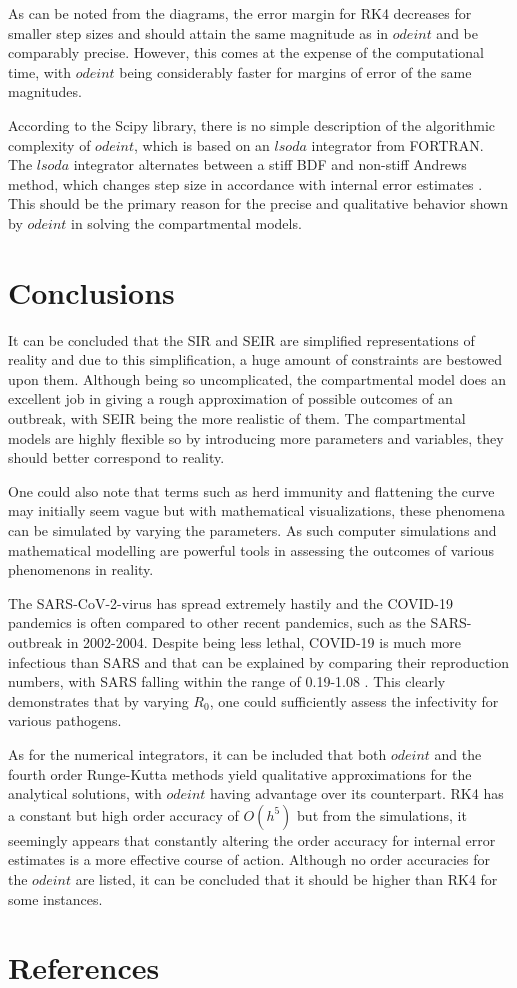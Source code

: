 \documentclass[12pt]{article}
\begin{document}
\noindent As can be noted from the diagrams, the error margin for RK4 decreases for smaller step sizes and should attain the same magnitude as in $odeint$ and be comparably precise. However, this comes at the expense of the computational time, with $odeint$ being considerably faster for margins of error of the same magnitudes. 

According to the Scipy library, there is no simple description of the algorithmic complexity of $odeint$, which is based on an $lsoda$ integrator from FORTRAN. The $lsoda$ integrator alternates between a stiff BDF and non-stiff Andrews method, which changes step size in accordance with internal error estimates \cite{scipy}.  This should be the primary reason for the precise and qualitative behavior shown by $odeint$ in solving the compartmental models. 


\newpage 
\section{Conclusions}
It can be concluded that the SIR and SEIR are simplified representations of reality and due to this simplification, a huge amount of constraints are bestowed upon them. Although being so uncomplicated, the compartmental model does an excellent job in giving a rough approximation of possible outcomes of an outbreak, with SEIR being the more realistic of them. The compartmental models are highly flexible so by introducing more parameters and variables, they should better correspond to reality. 

One could also note that terms such as herd immunity and flattening the curve may initially seem vague but with mathematical visualizations, these phenomena can be simulated by varying the parameters. As such computer simulations and mathematical modelling are powerful tools in assessing the outcomes of various phenomenons in reality. 

The SARS-CoV-2-virus has spread extremely hastily and the COVID-19 pandemics is often compared to other recent pandemics, such as the SARS-outbreak in 2002-2004. Despite being less lethal, COVID-19 is much more infectious than SARS and that can be explained by comparing their reproduction numbers, with SARS falling within the range of 0.19-1.08 \cite{chowell}. This clearly demonstrates that by varying $R_0$, one could sufficiently assess the infectivity for various pathogens.

As for the numerical integrators, it can be included that both $odeint$ and the fourth order Runge-Kutta methods yield qualitative approximations for the analytical solutions, with $odeint$ having advantage over its counterpart. RK4 has a constant but high order accuracy of $O(h^5)$ but from the simulations, it seemingly appears that constantly altering the order accuracy for internal error estimates is a more effective course of action. Although no order accuracies for the $odeint$ are listed, it can be concluded that it should be higher than RK4 for some instances.
 
\newpage 
\section{References}
\printbibliography[heading=none]
\end{document}
